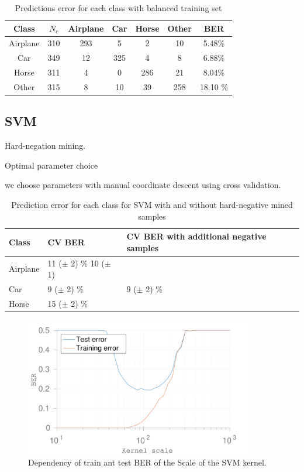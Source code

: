 \documentclass{article} %
\begin{document}
\begin{table}
	\centering
	\begin{tabular}{|c|c|c|c|c|c|c|}
		\hline Class & $N_{c}$ & Airplane & Car & Horse & Other & BER \\ 
		\hline Airplane & 310 & 293 & 5 & 2 & 10 & 5.48\% \\ 
		\hline Car & 349 & 12 & 325 & 4 & 8 & 6.88\% \\ 
		\hline Horse & 311 & 4 & 0 & 286 & 21 & 8.04\% \\ 
		\hline Other & 315 & 8 & 10 & 39 & 258 & 18.10 \% \\ 
		\hline 
	\end{tabular} 
	\caption{Predictions error for each class with balanced training set}
	\label{tbl:errClassBal}
\end{table}


\subsection{SVM}

Hard-negation mining.

Optimal parameter choice

we choose parameters with manual coordinate descent using cross validation.

\begin{table}
  \centering
  \begin{tabular}{l|l|l}
    \hline
    Class & CV BER & CV BER with additional negative samples \\ \hline
    Airplane & 11 ($\pm$ 2) \% 10 ($\pm$ 1) & \\
    Car & 9 ($\pm$ 2) \% & 9 ($\pm$ 2) \% \\
    Horse & 15 ($\pm$ 2) \% & \\ \hline
  \end{tabular}
  \caption{Prediction error for each class for SVM with and without hard-negative mined samples}
  \label{tbl:SVMerr}
\end{table}


\begin{figure}[!t]
  \centering
  \includegraphics[width=0.9\textwidth]{figures/kernel_scale_ber.pdf}
  \caption{Dependency of train ant test BER of the Scale of the SVM kernel.}
\end{figure}
\end{document}
